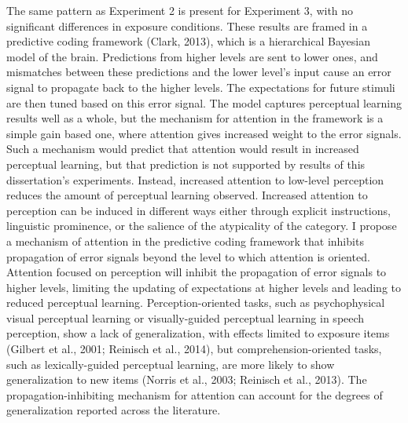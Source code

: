 \documentclass[11pt]{article} %
\begin{document}
The same pattern as Experiment 2 is present for Experiment 3, with no significant differences in exposure conditions.
These results are framed in a predictive coding framework (Clark, 2013), which is a hierarchical Bayesian model of the brain. 
Predictions from higher levels are sent to lower ones, and mismatches between these predictions and the lower level's input cause an error signal to propagate back to the higher levels.
The expectations for future stimuli are then tuned based on this error signal.
The model captures perceptual learning results well as a whole, but the mechanism for attention in the framework is a simple gain based one, where attention gives increased weight to the error signals.
Such a mechanism would predict that attention would result in increased perceptual learning, but that prediction is not supported by results of this dissertation's experiments.
Instead, increased attention to low-level perception reduces the amount of perceptual learning observed.
Increased attention to perception can be induced in different ways either through explicit instructions, linguistic prominence, or the salience of the atypicality of the category.
I propose a mechanism of attention in the predictive coding framework that inhibits propagation of error signals beyond the level to which attention is oriented.
Attention focused on perception will inhibit the propagation of error signals to higher levels, limiting the updating of expectations at higher levels and leading to reduced perceptual learning.
Perception-oriented tasks, such as psychophysical visual perceptual learning or visually-guided perceptual learning in speech perception, show a lack of generalization, with effects limited to exposure items (Gilbert et al., 2001; Reinisch et al., 2014), but comprehension-oriented tasks, such as lexically-guided perceptual learning, are more likely to show generalization to new items (Norris et al., 2003; Reinisch et al., 2013).
The propagation-inhibiting mechanism for attention can account for the degrees of generalization reported across the literature.
\end{document}
